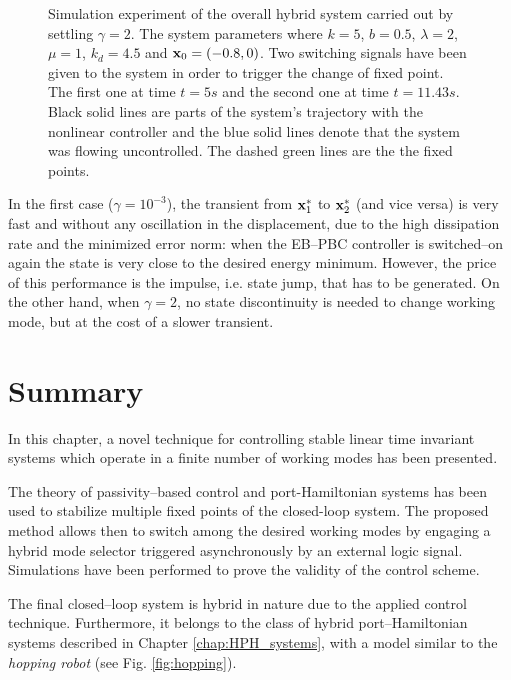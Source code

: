 \begin{figure}[!ht]
	\centering
	\caption[Simulation experiment of the overall hybrid system with $\gamma = 2$]{Simulation experiment of the overall hybrid system carried out by settling $\gamma = 2$. The system parameters where $k = 5$, $b = 0.5$, $\lambda = 2$, $\mu = 1$, $k_d = 4.5$ and $\mathbf{x}_0 = (-0.8,0)$. 
	Two switching signals have been given to the system in order to trigger the change of fixed point. The first one at time $t = 5s$ and the second one at time $t = 11.43s$. Black solid lines are parts of the system's trajectory with the nonlinear controller and the blue solid lines denote that the system was flowing uncontrolled. The dashed green lines are the the fixed points.
	}
	\label{fig:exp2}
\end{figure}
%
In the first case ($\gamma = 10^{-3}$), the transient from $\mathbf{x}_1^*$ to $\mathbf{x}_2^*$ (and vice versa) is very fast and without any oscillation in the displacement, due to the high dissipation rate and the minimized error norm: when the EB--PBC controller is switched--on again the state is very close to the desired energy minimum. However, the price of this performance is the impulse, i.e. state jump, that has to be generated. On the other hand, when $\gamma = 2$, no state discontinuity is needed to change working mode, but at the cost of a slower transient.
%
\clearpage
%
\section{Summary}
In this chapter, a novel technique for controlling stable linear time invariant systems which operate in a finite number of working modes has been presented. 
%
\newline

%
The theory of passivity--based control and port-Hamiltonian systems has been used to stabilize multiple fixed points of the closed-loop system. The proposed method allows then to switch among the desired working modes by engaging a hybrid mode selector triggered asynchronously by an external logic signal. Simulations have been performed to prove the validity of the control scheme. 
%
\newline

%
The final closed--loop system is hybrid in nature due to the applied control technique. Furthermore, it belongs to the class of hybrid port--Hamiltonian systems described in Chapter \ref{chap:HPH_systems}, with a model similar to the \textit{hopping robot} (see Fig. \ref{fig:hopping}).

\clearpage